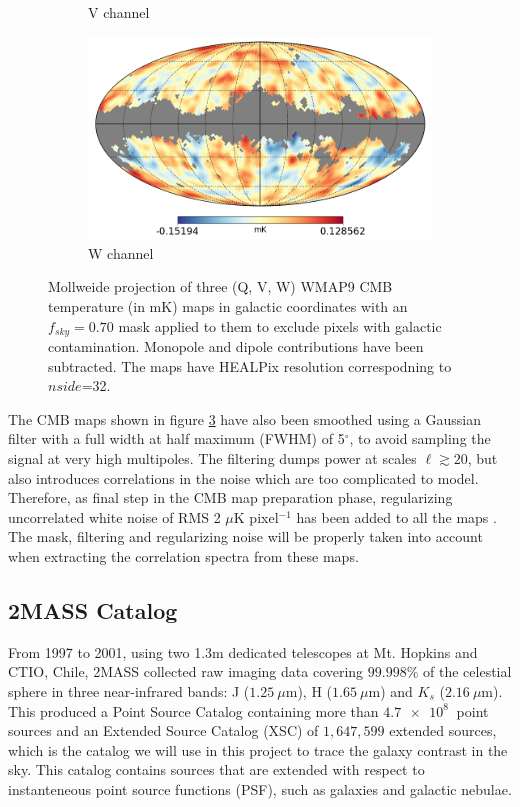 \documentclass[openany,a4paper,12pt,oneside]{book}
\begin{document}
\begin{spacing}{1.5}
\begin{figure}[!htb]
\begin{subfigure}[b]{0.49\textwidth}
         \caption{V channel}
         \label{fig:Vchannel}
     \end{subfigure}
     \hfill
     \begin{subfigure}[b]{0.49\textwidth}
         \centering
         \includegraphics[width=\textwidth]{Imagens/wmap_W_wmask.png}
         \caption{W channel}
         \label{fig:Wchannel}
     \end{subfigure}
        \caption{Mollweide projection of three (Q, V, W) WMAP9 CMB temperature (in mK) maps in galactic coordinates with an $f_{sky}=0.70$ mask applied to them to exclude pixels with galactic contamination. Monopole and dipole contributions have been subtracted. The maps have HEALPix resolution correspodning to $nside$=32.}
        \label{fig:Wmap_maps}
\end{figure}

The CMB maps shown in figure \ref{fig:Wmap_maps} have also been smoothed using a Gaussian filter with a full width at half maximum (FWHM) of 5$^\circ$, to avoid sampling the signal at very high multipoles. The filtering dumps power at scales $\ell \gtrsim 20$, but also introduces correlations in the noise which are too complicated to model. Therefore, as final step in the CMB map preparation phase, regularizing uncorrelated white noise of RMS 2 $\mu$K pixel$^{-1}$ has been added to all the maps \cite{Moura-Santos_2016}. The mask, filtering and regularizing noise will be properly taken into account when extracting the correlation spectra from these maps.


\subsection{2MASS Catalog}

From 1997 to 2001, using two 1.3m dedicated telescopes at Mt. Hopkins and CTIO, Chile, 2MASS collected raw imaging data covering $99.998\%$ of the celestial sphere in three near-infrared bands: J ($\SI{1.25}{\mu \meter}$), H ($\SI{1.65}{\mu \meter}$) and $K_s$ ($\SI{2.16}{\mu \meter}$). This produced a Point Source Catalog containing more than $\SI{4.7e8}{}$ point sources and an Extended Source Catalog (XSC) of $1,647,599$ extended sources, which is the catalog we will use in this project to trace the galaxy contrast in the sky. This catalog contains sources that are extended with respect to instanteneous point source functions (PSF), such as galaxies and galactic nebulae.


\end{spacing}
\end{document}
